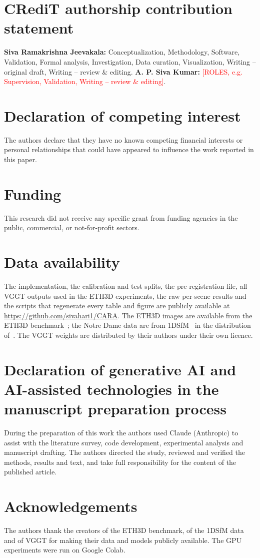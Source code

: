 \section*{CRediT authorship contribution statement}
\textbf{Siva Ramakrishna Jeevakala:} Conceptualization, Methodology, Software, Validation, Formal analysis, Investigation, Data curation, Visualization, Writing -- original draft, Writing -- review \& editing. \textbf{A. P. Siva Kumar:} \textcolor{red}{[ROLES, e.g. Supervision, Validation, Writing -- review \& editing]}.

\section*{Declaration of competing interest}
The authors declare that they have no known competing financial interests or personal relationships that could have appeared to influence the work reported in this paper.

\section*{Funding}
This research did not receive any specific grant from funding agencies in the public, commercial, or not-for-profit sectors.

\section*{Data availability}
The implementation, the calibration and test splits, the pre-registration file, all VGGT outputs used in the ETH3D experiments, the raw per-scene results and the scripts that regenerate every table and figure are publicly available at \url{https://github.com/sivahari1/CARA}. The ETH3D images are available from the ETH3D benchmark~\cite{schops2017eth3d}; the Notre Dame data are from 1DSfM~\cite{wilson2014robust} in the distribution of~\cite{chatterjee2018robust}. The VGGT weights are distributed by their authors under their own licence.

\section*{Declaration of generative AI and AI-assisted technologies in the manuscript preparation process}
During the preparation of this work the authors used Claude (Anthropic) to assist with the literature survey, code development, experimental analysis and manuscript drafting. The authors directed the study, reviewed and verified the methods, results and text, and take full responsibility for the content of the published article.

\section*{Acknowledgements}
The authors thank the creators of the ETH3D benchmark, of the 1DSfM data and of VGGT for making their data and models publicly available. The GPU experiments were run on Google Colab.
